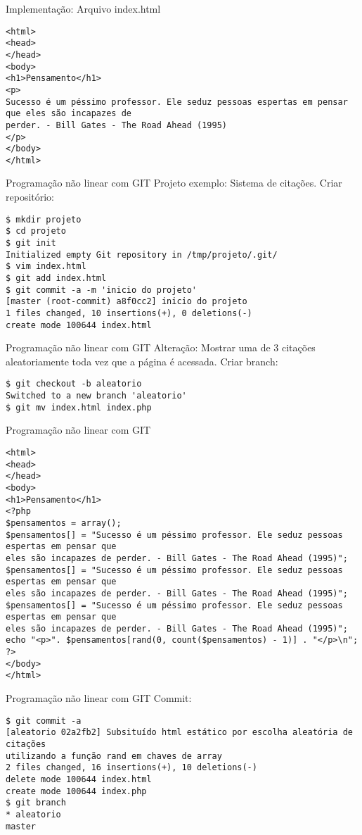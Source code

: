 \documentclass{beamer}
\begin{document}
Implementação:
Arquivo index.html
\begin{verbatim}
<html>
<head>
</head>
<body>
<h1>Pensamento</h1>
<p>
Sucesso é um péssimo professor. Ele seduz pessoas espertas em pensar que eles são incapazes de
perder. - Bill Gates - The Road Ahead (1995)
</p>
</body>
</html>
\end{verbatim}

Programação não linear com GIT
Projeto exemplo:
Sistema de citações.
Criar repositório:
\begin{verbatim}
$ mkdir projeto
$ cd projeto
$ git init
Initialized empty Git repository in /tmp/projeto/.git/
$ vim index.html
$ git add index.html
$ git commit -a -m 'inicio do projeto'
[master (root-commit) a8f0cc2] inicio do projeto
1 files changed, 10 insertions(+), 0 deletions(-)
create mode 100644 index.html
\end{verbatim}

Programação não linear com GIT
Alteração:
Mostrar uma de 3 citações aleatoriamente toda vez que a página é acessada.
Criar branch:
\begin{verbatim}
$ git checkout -b aleatorio
Switched to a new branch 'aleatorio'
$ git mv index.html index.php
\end{verbatim}

Programação não linear com GIT
\begin{verbatim}
<html>
<head>
</head>
<body>
<h1>Pensamento</h1>
<?php
$pensamentos = array();
$pensamentos[] = "Sucesso é um péssimo professor. Ele seduz pessoas espertas em pensar que
eles são incapazes de perder. - Bill Gates - The Road Ahead (1995)";
$pensamentos[] = "Sucesso é um péssimo professor. Ele seduz pessoas espertas em pensar que
eles são incapazes de perder. - Bill Gates - The Road Ahead (1995)";
$pensamentos[] = "Sucesso é um péssimo professor. Ele seduz pessoas espertas em pensar que
eles são incapazes de perder. - Bill Gates - The Road Ahead (1995)";
echo "<p>". $pensamentos[rand(0, count($pensamentos) - 1)] . "</p>\n";
?>
</body>
</html>
\end{verbatim}

Programação não linear com GIT
Commit:
\begin{verbatim}
$ git commit -a
[aleatorio 02a2fb2] Subsituído html estático por escolha aleatória de citações
utilizando a função rand em chaves de array
2 files changed, 16 insertions(+), 10 deletions(-)
delete mode 100644 index.html
create mode 100644 index.php
$ git branch
* aleatorio
master
\end{verbatim}
\end{document}

